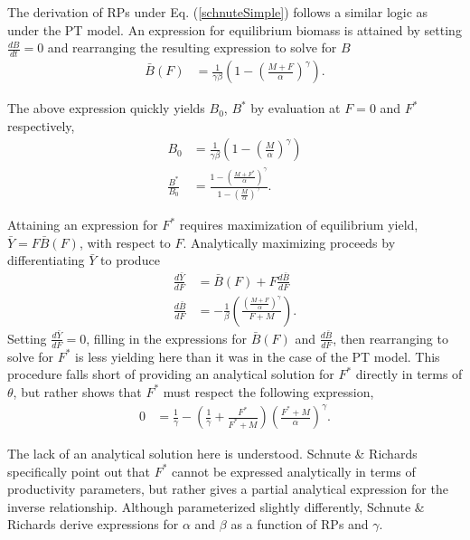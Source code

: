 
%
The derivation of RPs under Eq. (\ref{schnuteSimple}) follows a similar logic
as under the PT model. An expression for equilibrium biomass is attained by
setting $\frac{dB}{dt}=0$ and rearranging the resulting expression to solve
for $B$
%
\begin{align}
\bar{B}(F) &= \frac{1}{\gamma \beta}\left(1-\left(\frac{M+F}{\alpha}\right)^\gamma\right).
\label{BsEq}
\end{align}

%
The above expression quickly yields $B_0$, $B^*$ by evaluation at $F=0$ and $F^*$ respectively,
\begin{align}
B_0 &= \frac{1}{\gamma \beta}\left(1-\left(\frac{M}{\alpha}\right)^\gamma\right) \label{B0S}\\
\frac{B^*}{B_0} &= \frac{1-\left(\frac{M+F^*}{\alpha}\right)^\gamma}{ 1-\left(\frac{M}{\alpha}\right)^\gamma }. \label{BratS}
\end{align}


%
Attaining an expression for $F^*$ requires maximization of equilibrium
yield, \mbox{$\bar{Y}=F\bar{B}(F)$}, with respect to $F$. Analytically maximizing
proceeds by differentiating $\bar{Y}$ to produce
%
\begin{align}
\frac{d \bar{Y}}{dF} &= \bar B(F) + F \frac{d \bar B}{dF} \label{FderivS}\\
\frac{d \bar B}{dF} &= -\frac{1}{\beta}  \left(\frac{\left(\frac{M+F}{\alpha}\right)^\gamma}{F+M}\right)\label{dBdFS}.
\end{align}
%
Setting $\frac{d \bar{Y}}{dF}=0$, filling in the expressions for $\bar B(F)$
and $\frac{d \bar B}{dF}$, then rearranging to solve for $F^*$ is less
yielding here than it was in the case of the PT model. This procedure falls
short of providing an analytical solution for $F^*$ directly in terms of
$\theta$, %
but rather shows that $F^*$ must respect the following expression,
%
\begin{align}\label{FmsyS}
0 &= \frac{1}{\gamma} - \left(\frac{1}{\gamma} + \frac{F^*}{F^*+M}\right)\left(\frac{F^*+M}{\alpha}\right)^\gamma.
\end{align}

The lack of an analytical solution here is understood.
Schnute \& Richards \cite[pg. 519]{schnute_analytical_1998} specifically point out that
$F^*$ cannot be expressed analytically in terms of productivity parameters,
but rather gives a partial analytical expression for the inverse relationship.
Although parameterized slightly differently, Schnute \& Richards %
derive expressions for $\alpha$ and $\beta$ as a function of RPs and $\gamma$.

